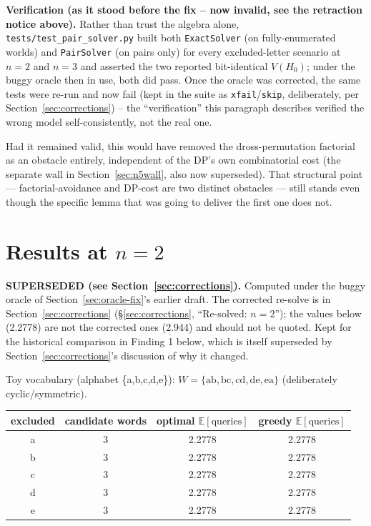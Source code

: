\documentclass[11pt]{article}
\begin{document}
\textbf{Verification (as it stood before the fix -- now invalid, see the
retraction notice above).} Rather than trust the algebra alone,
\texttt{tests/test\_pair\_solver.py} built both \texttt{ExactSolver} (on
fully-enumerated worlds) and \texttt{PairSolver} (on pairs only) for every
excluded-letter scenario at $n=2$ and $n=3$ and asserted the two reported
bit-identical $V(H_0)$; under the buggy oracle then in use, both did pass.
Once the oracle was corrected, the same tests were re-run and now fail
(kept in the suite as \texttt{xfail}/\texttt{skip}, deliberately, per
Section~\ref{sec:corrections}) -- the ``verification'' this paragraph
describes verified the wrong model self-consistently, not the real one.

Had it remained valid, this would have removed the dross-permutation
factorial as an obstacle entirely, independent of the DP's own
combinatorial cost (the separate wall in Section~\ref{sec:n5wall}, also
now superseded). That structural point --- factorial-avoidance and
DP-cost are two distinct obstacles --- still stands even though the
specific lemma that was going to deliver the first one does not.

\section{Results at $n=2$}
\label{sec:results}

\textbf{SUPERSEDED (see Section~\ref{sec:corrections}).} Computed under
the buggy oracle of Section~\ref{sec:oracle-fix}'s earlier draft. The
corrected re-solve is in Section~\ref{sec:corrections}
(\S\ref{sec:corrections}, ``Re-solved: $n=2$''); the values below
(2.2778) are not the corrected ones (2.944) and should not be quoted.
Kept for the historical comparison in Finding 1 below, which is itself
superseded by Section~\ref{sec:corrections}'s discussion of why it
changed.

Toy vocabulary (alphabet \{a,b,c,d,e\}): $W = \{\mathrm{ab, bc, cd, de,
ea}\}$ (deliberately cyclic/symmetric).

\begin{center}
\begin{tabular}{cccc}
\toprule
excluded & candidate words & optimal $\mathbb{E}[\text{queries}]$ & greedy $\mathbb{E}[\text{queries}]$ \\
\midrule
a & 3 & 2.2778 & 2.2778 \\
b & 3 & 2.2778 & 2.2778 \\
c & 3 & 2.2778 & 2.2778 \\
d & 3 & 2.2778 & 2.2778 \\
e & 3 & 2.2778 & 2.2778 \\
\bottomrule
\end{tabular}
\end{center}
\end{document}
